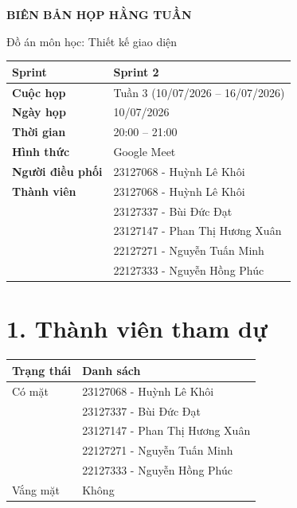 \documentclass[11pt,a4paper]{article}
\begin{document}
\begin{center}
    {\Huge\bfseries BIÊN BẢN HỌP HẰNG TUẦN}

    \vspace{0.2cm}

    {\Large Đồ án môn học: Thiết kế giao diện}
\end{center}

\vspace{0.8cm}

\begin{tabularx}{\textwidth}{|>{\bfseries}p{4cm}|X|}
\hline
Sprint & Sprint 2 \\ \hline
Cuộc họp & Tuần 3 (10/07/2026 -- 16/07/2026) \\ \hline
Ngày họp & 10/07/2026 \\ \hline
Thời gian & 20:00 -- 21:00 \\ \hline
Hình thức & Google Meet \\ \hline
Người điều phối & 23127068 - Huỳnh Lê Khôi \\ \hline
Thành viên &
23127068 - Huỳnh Lê Khôi\\
&
23127337 - Bùi Đức Đạt\\
&
23127147 - Phan Thị Hương Xuân\\
&
22127271 - Nguyễn Tuấn Minh\\
&
22127333 - Nguyễn Hồng Phúc\\
\hline
\end{tabularx}

\vspace{0.8cm}


\section*{1. Thành viên tham dự}

\begin{tabularx}{\textwidth}{|p{4cm}|X|}
\hline
\rowcolor{gray!20}
\textbf{Trạng thái} & \textbf{Danh sách}\\
\hline
Có mặt &
23127068 - Huỳnh Lê Khôi\\
&
23127337 - Bùi Đức Đạt\\
&
23127147 - Phan Thị Hương Xuân\\
&
22127271 - Nguyễn Tuấn Minh\\
&
22127333 - Nguyễn Hồng Phúc\\
\hline
Vắng mặt & Không\\
\hline
\end{tabularx}
\end{document}
